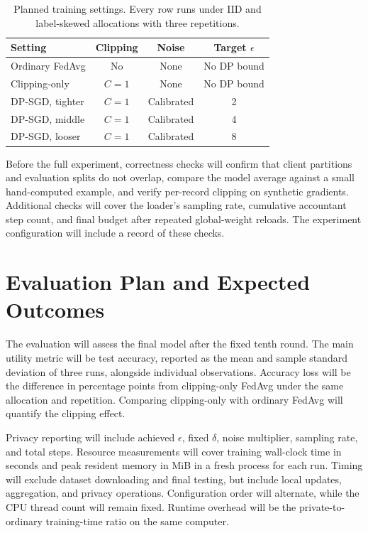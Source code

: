 \documentclass[nolineno]{ieeeaccess}
\begin{document}
\begin{table}[t]
\caption{Planned training settings. Every row runs under IID and label-skewed allocations with three repetitions.}
\label{tab:design}
\centering
\small
\setlength{\tabcolsep}{4pt}
\begin{tabular}{lccc}
\toprule
\textbf{Setting} & \textbf{Clipping} & \textbf{Noise} & \textbf{Target $\epsilon$}\\
\midrule
Ordinary FedAvg & No & None & No DP bound\\
Clipping-only & $C=1$ & None & No DP bound\\
DP-SGD, tighter & $C=1$ & Calibrated & 2\\
DP-SGD, middle & $C=1$ & Calibrated & 4\\
DP-SGD, looser & $C=1$ & Calibrated & 8\\
\bottomrule
\end{tabular}
\end{table}

Before the full experiment, correctness checks will confirm that client partitions and evaluation splits do not overlap, compare the model average against a small hand-computed example, and verify per-record clipping on synthetic gradients. Additional checks will cover the loader's sampling rate, cumulative accountant step count, and final budget after repeated global-weight reloads. The experiment configuration will include a record of these checks.

\section{Evaluation Plan and Expected Outcomes}
The evaluation will assess the final model after the fixed tenth round. The main utility metric will be test accuracy, reported as the mean and sample standard deviation of three runs, alongside individual observations. Accuracy loss will be the difference in percentage points from clipping-only FedAvg under the same allocation and repetition. Comparing clipping-only with ordinary FedAvg will quantify the clipping effect.

Privacy reporting will include achieved $\epsilon$, fixed $\delta$, noise multiplier, sampling rate, and total steps. Resource measurements will cover training wall-clock time in seconds and peak resident memory in MiB in a fresh process for each run. Timing will exclude dataset downloading and final testing, but include local updates, aggregation, and privacy operations. Configuration order will alternate, while the CPU thread count will remain fixed. Runtime overhead will be the private-to-ordinary training-time ratio on the same computer.
\end{document}
